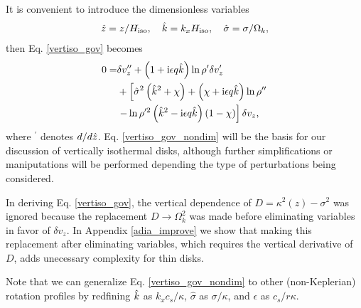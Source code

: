 It is convenient to introduce the dimensionless variables
\begin{align}
  \hat{z} = z/H_\mathrm{iso},\quad \hat{k}=k_xH_\mathrm{iso}, \quad \hat{\sigma} = \sigma/\Omega_k,
\end{align}
then Eq. \ref{vertiso_gov} becomes
\begin{align}
  0=& \delta v_z ^{\prime\prime} + \left(1 + \mathrm{i}\epsilon
    q\hat{k}\right)\ln\rho^{\prime}\delta v_z^\prime \notag\\
  &+
  \left[\hat{\sigma}^2\left(\hat{k}^2+\chi\right) +
    \left(  \chi + \mathrm{i} \epsilon q\hat{k}\right)\ln\rho^{\prime\prime}\right.
    \notag\\
    &\left.- \ln\rho^{\prime
      2}\left(\hat{k}^2 -
      \mathrm{i}\epsilon
      q\hat{k}\right)\left(1 - \chi\right)\right]\delta v_z,\label{vertiso_gov_nondim}
\end{align}
where $^\prime$ denotes $d/d\hat{z}$. Eq. \ref{vertiso_gov_nondim} will
be the basis for our discussion of vertically isothermal disks,
although further simplifications or maniputations will be performed
depending the type of perturbations being considered. 

In deriving Eq. \ref{vertiso_gov}, the vertical dependence of
$D=\kappa^2(z)-\sigma^2$ was ignored because the replacement
$D\to\Omega_k^2$ was made before eliminating variables in favor of
$\delta v_z$. In Appendix \ref{adia_improve} we show that making this
replacement after eliminating variables, which requires the vertical
derivative of $D$, adds unecessary complexity for thin disks.  


Note that we can generalize Eq. \ref{vertiso_gov_nondim} to other
(non-Keplerian) rotation profiles by redfining $\hat{k}$
 as $k_xc_s/\kappa$, $\hat{\sigma}$ as $\sigma/\kappa$, and 
 $\epsilon$ as $c_s/r\kappa$.    



